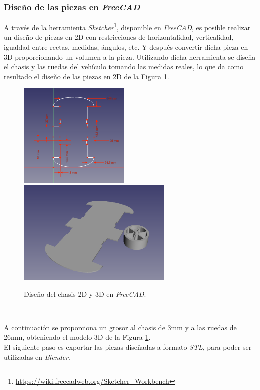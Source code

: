 \subsubsection{Diseño de las piezas en \textit{FreeCAD}}
A través de la herramienta \textit{Sketcher}\footnote{\url{https://wiki.freecadweb.org/Sketcher_Workbench}}, disponible en \textit{FreeCAD}, es posible realizar un diseño de piezas en 2D con restricciones de horizontalidad, verticalidad, igualdad entre rectas, medidas, ángulos, etc. Y después convertir dicha pieza en 3D proporcionando un volumen a la pieza. Utilizando dicha herramienta se diseña el chasis y las ruedas del vehículo tomando las medidas reales, lo que da como resultado el diseño de las piezas en 2D de la Figura \ref{fig:designfreecad}.\\
\begin{figure} [h!]
	\begin{center}
		\includegraphics[height=5cm]{figs/sketchFreecad}\hspace{0.1cm}\includegraphics[height=5cm]{figs/freecad}
	\end{center}
	\caption{Diseño del chasis 2D y 3D en \textit{FreeCAD}.}
	\label{fig:designfreecad}
\end{figure}\

A continuación se proporciona un grosor al chasis de 3mm y a las ruedas de 26mm, obteniendo el modelo 3D de la Figura \ref{fig:designfreecad}.\\

El siguiente paso es exportar las piezas diseñadas a formato \textit{STL}, para poder ser utilizadas en \textit{Blender}.\\

